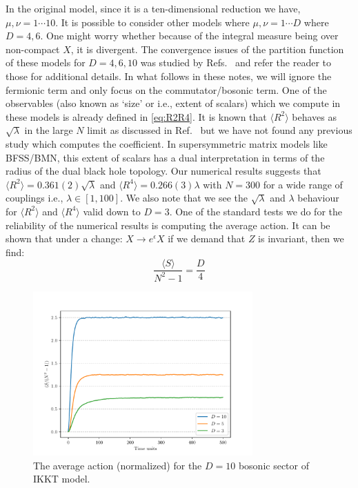 \documentclass[11pt]{article}
\begin{document}
In the original model, since it is a ten-dimensional reduction we have, $\mu, \nu = 1 \cdots 10$. 
It is possible to consider other models where $\mu, \nu = 1 \cdots D$ where $D=4,6$. 
One might worry whether because of the integral measure being over non-compact $X$, 
it is divergent. The convergence issues of the partition function of 
these models for $D=4,6,10$ was studied by Refs.~\cite{Krauth:1998yu,Krauth:1999qw} and 
refer the reader to those for additional details.  
In what follows in these notes, we will ignore the fermionic 
term and only focus on the commutator/bosonic term. 
One of the observables (also known as `size' or i.e., extent of scalars) 
which we compute in these models is already defined in \ref{eq:R2R4}. 
It is known that $\langle R^2 \rangle$ behaves as $\sqrt{\lambda}$ in the large $N$ limit 
as discussed in Ref.~\cite{Hotta:1998en} but we have not found any previous study
which computes the coefficient. In supersymmetric matrix models like BFSS/BMN, this 
extent of scalars has a dual interpretation in terms of the radius of 
the dual black hole topology.  Our numerical results suggests 
that $ \langle R^2 \rangle = 0.361(2) \sqrt{\lambda}$ 
and $ \langle R^4 \rangle = 0.266(3) \lambda$ with $N = 300$ for a wide range of couplings i.e., 
$\lambda \in [1,100]$. We also note that we see the $\sqrt{\lambda}$ and $\lambda$ behaviour for 
$\langle R^2 \rangle$ and $\langle R^4 \rangle$ valid down to $D=3$. 
One of the standard tests we do for the reliability of the numerical results is 
computing the average action. It can be shown that under a 
change: $X \to e^{\epsilon} X$ if we demand that $Z$ is invariant, 
then we find:
\begin{equation}
\label{eq:SD_IKKT1} 
	\frac{\langle S \rangle}{N^2 - 1} = \frac{D}{4} 
\end{equation}
\begin{figure}[htbp] 
	\centering 
	\includegraphics[width=0.75\textwidth]{figs/act_allD_YM.pdf}
	\caption{\label{fig:IKKT_2}The average action (normalized) for the $D=10$ bosonic sector of IKKT model.}
\end{figure}
\end{document}
